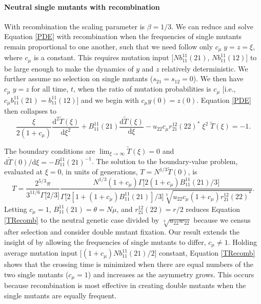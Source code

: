 \documentclass[review,3p,authoryear]{elsarticle}
\begin{document}
\begin{appendices}

\paragraph{Neutral single mutants with recombination}

With recombination the scaling parameter is $\beta=1/3$.
We can reduce and solve Equation \eqref{PDE} with recombination when the frequencies of single mutants remain proportional to one another, such that we need follow only $c_\mu \; y = z = \xi$, where $c_\mu$ is a constant. 
This requires mutation input [$N b_{11}^{11}(21)$, $N b_{11}^{11}(12)$] to be large enough to make the dynamics of $y$ and $z$ relatively deterministic.
We further assume no selection on single mutants ($s_{21} = s_{12} = 0$).
We then have $c_\mu \; y = z$ for all time, $t$, when the ratio of mutation probabilities is $c_\mu$ [i.e., $c_\mu b_{11}^{11}(21) = b_{11}^{11}(12)$] and we begin with $c_\mu y(0) = z(0)$. 
Equation \eqref{PDE} then collapses to
\begin{equation}
\frac{\xi}{2 (1 + c_\mu)} \frac{\mathrm{d}^2 \tilde{T}(\xi)}{\mathrm{d} \xi^2} + B_{11}^{11}(21) \frac{\mathrm{d} \tilde{T}(\xi)}{\mathrm{d} \xi} -  u_{22}c_\mu r_{21}^{12}(22)^* \; \xi^2 \; \tilde{T}(\xi) = -1.
\end{equation}

The boundary conditions are $\lim_{\xi\rightarrow\infty}\tilde{T}(\xi) = 0$ and $\mathrm{d}\tilde{T}(0)/\mathrm{d}\xi = -B_{11}^{11}(21)^{-1}$.  
The solution to the boundary-value problem, evaluated at $\xi = 0$, in units of generations, $T = N^{1/3} \tilde{T}(0)$, is
\begin{equation}\label{TRecomb}
T = \frac{ 2^{5/3} \pi} { 3^{11/6} \Gamma \Big[ 2/3 \Big]} \frac{N^{1/3} (1+c_\mu) \Gamma \Big[ 2 (1+c_\mu) B_{11}^{11}(21) / 3 \Big] }{\Gamma \Big[ 2 [1 + (1 + c_\mu) B_{11}^{11}(21)] / 3 \Big] \sqrt[3]{ u_{22}c_\mu (1 + c_\mu) r_{21}^{12}(22)^*}}.
\end{equation}
Letting $c_\mu=1$, $B_{11}^{11}(21) = \theta = N \mu$, and $r_{21}^{12}(22) = r/2$ reduces Equation \eqref{TRecomb} to the neutral genetic case \citep[equation 30 in][]{Christiansen1998} divided by $\sqrt[3]{u_{22}w_{22}}$ because we census after selection and consider double mutant fixation.
Our result extends the insight of \cite{Christiansen1998} by allowing the frequencies of single mutants to differ, $c_\mu\neq 1$.
Holding average mutation input [$(1+c_\mu)Nb_{11}^{11}(21)/2$] constant, Equation \eqref{TRecomb} shows that the crossing time is minimized when there are equal numbers of the two single mutants ($c_\mu=1$) and increases as the asymmetry grows.
This occurs because recombination is most effective in creating double mutants when the single mutants are equally frequent.


\end{appendices}
\end{document}
